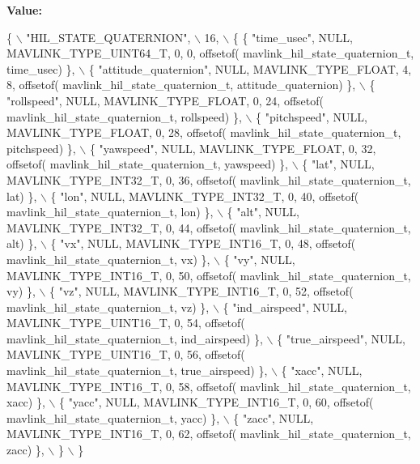 {\bfseries Value\+:}
\begin{DoxyCode}
\{ \(\backslash\)
    \textcolor{stringliteral}{"HIL\_STATE\_QUATERNION"}, \(\backslash\)
    16, \(\backslash\)
    \{  \{ \textcolor{stringliteral}{"time\_usec"}, NULL, MAVLINK_TYPE_UINT64_T, 0, 0, offsetof(
      mavlink_hil_state_quaternion_t, time\_usec) \}, \(\backslash\)
         \{ \textcolor{stringliteral}{"attitude\_quaternion"}, NULL, MAVLINK_TYPE_FLOAT, 4, 8, offsetof(
      mavlink_hil_state_quaternion_t, attitude\_quaternion) \}, \(\backslash\)
         \{ \textcolor{stringliteral}{"rollspeed"}, NULL, MAVLINK_TYPE_FLOAT, 0, 24, offsetof(
      mavlink_hil_state_quaternion_t, rollspeed) \}, \(\backslash\)
         \{ \textcolor{stringliteral}{"pitchspeed"}, NULL, MAVLINK_TYPE_FLOAT, 0, 28, offsetof(
      mavlink_hil_state_quaternion_t, pitchspeed) \}, \(\backslash\)
         \{ \textcolor{stringliteral}{"yawspeed"}, NULL, MAVLINK_TYPE_FLOAT, 0, 32, offsetof(
      mavlink_hil_state_quaternion_t, yawspeed) \}, \(\backslash\)
         \{ \textcolor{stringliteral}{"lat"}, NULL, MAVLINK_TYPE_INT32_T, 0, 36, offsetof(
      mavlink_hil_state_quaternion_t, lat) \}, \(\backslash\)
         \{ \textcolor{stringliteral}{"lon"}, NULL, MAVLINK_TYPE_INT32_T, 0, 40, offsetof(
      mavlink_hil_state_quaternion_t, lon) \}, \(\backslash\)
         \{ \textcolor{stringliteral}{"alt"}, NULL, MAVLINK_TYPE_INT32_T, 0, 44, offsetof(
      mavlink_hil_state_quaternion_t, alt) \}, \(\backslash\)
         \{ \textcolor{stringliteral}{"vx"}, NULL, MAVLINK_TYPE_INT16_T, 0, 48, offsetof(
      mavlink_hil_state_quaternion_t, vx) \}, \(\backslash\)
         \{ \textcolor{stringliteral}{"vy"}, NULL, MAVLINK_TYPE_INT16_T, 0, 50, offsetof(
      mavlink_hil_state_quaternion_t, vy) \}, \(\backslash\)
         \{ \textcolor{stringliteral}{"vz"}, NULL, MAVLINK_TYPE_INT16_T, 0, 52, offsetof(
      mavlink_hil_state_quaternion_t, vz) \}, \(\backslash\)
         \{ \textcolor{stringliteral}{"ind\_airspeed"}, NULL, MAVLINK_TYPE_UINT16_T, 0, 54, offsetof(
      mavlink_hil_state_quaternion_t, ind\_airspeed) \}, \(\backslash\)
         \{ \textcolor{stringliteral}{"true\_airspeed"}, NULL, MAVLINK_TYPE_UINT16_T, 0, 56, offsetof(
      mavlink_hil_state_quaternion_t, true\_airspeed) \}, \(\backslash\)
         \{ \textcolor{stringliteral}{"xacc"}, NULL, MAVLINK_TYPE_INT16_T, 0, 58, offsetof(
      mavlink_hil_state_quaternion_t, xacc) \}, \(\backslash\)
         \{ \textcolor{stringliteral}{"yacc"}, NULL, MAVLINK_TYPE_INT16_T, 0, 60, offsetof(
      mavlink_hil_state_quaternion_t, yacc) \}, \(\backslash\)
         \{ \textcolor{stringliteral}{"zacc"}, NULL, MAVLINK_TYPE_INT16_T, 0, 62, offsetof(
      mavlink_hil_state_quaternion_t, zacc) \}, \(\backslash\)
         \} \(\backslash\)
\}
\end{DoxyCode}
